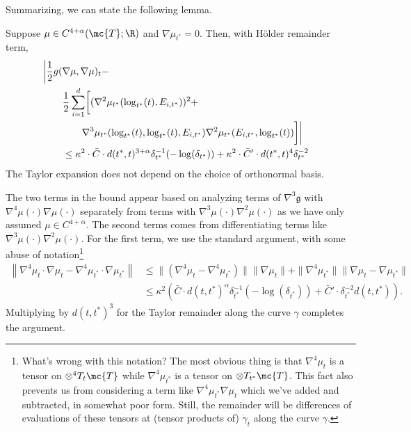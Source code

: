 \documentclass{article}
\begin{document}
Summarizing, we can state the following lemma.
\begin{lemma}
\label{lem:grad:density}
  Suppose $\mu \in C^{4+\alpha}(\mc{T};\R)$ and $\nabla \mu_{t^*}=0$. Then, with H\"older remainder term,
  \begin{equation}
\begin{aligned}
\lefteqn{    \biggl| \frac{1}{2} g(\nabla \mu, \nabla \mu)_t -  } \\
& \qquad  \frac{1}{2}\sum_{i=1}^d \biggl[ (\nabla^2 \mu_{t^*}(\log_{t^*}(t), E_{i,t^*}))^2 + \\
    & \qquad \qquad 
      \nabla^3 \mu_{t^*}(\log_{t^*}(t), \log_{t^*}(t), E_{i,t^*}) \nabla^2 \mu_{t^*}(E_{i,t^*}, \log_{t^*}(t)) \biggr] \biggr| \\
& \qquad \leq \kappa^2 \cdot \bar{C} \cdot d(t^*,t)^{3+\alpha} \delta^{-1}_{t^*}(-\log(\delta_{t^*})) +
\kappa^2 \cdot \bar{C}' \cdot d(t^*,t)^4 \delta_{t^*}^{-2}
\end{aligned}
    \end{equation}
The Taylor expansion does not depend on the choice of orthonormal basis.
  \end{lemma}
The two terms in the bound appear  based on analyzing terms of $\nabla^3 \mathfrak{g}$ with $\nabla^4 \mu(\cdot) \nabla \mu(\cdot)$ separately from
terms with $\nabla^3 \mu(\cdot) \nabla^2 \mu(\cdot)$ as we have only assumed $\mu \in C^{4+\alpha}$. The second
terms comes from differentiating terms like $\nabla^3 \mu(\cdot) \nabla^2 \mu(\cdot)$. For the first term, we use the standard argument, with some abuse of notation\footnote{What's wrong with this notation? The most obvious thing
is that $\nabla^4 \mu_t$ is a tensor on $\otimes^4 T_t\mc{T}$ while $\nabla^4 \mu_{t^*}$ is a tensor
on $\otimes T_{t^*}\mc{T}$. This fact also prevents us from considering a term like $\nabla^4 \mu_{t^*}\nabla \mu_t$ which we've added and subtracted, in somewhat poor form. Still, the remainder will be differences of evaluations of these tensors at (tensor products of) $\dot{\gamma}_t$
along the curve $\gamma$. }
$$
\begin{aligned}
  \left\|\nabla^4 \mu_t \cdot \nabla \mu_t - \nabla^4 \mu_{t^*} \cdot \nabla\mu_{t^*} \right\|
&  \leq \|(\nabla^4\mu_t - \nabla^4 \mu_{t^*})\| \|\nabla \mu_{t}\| +
  \|\nabla^4 \mu_{t^*}\| \|\nabla \mu_t - \nabla \mu_{t^*}\| \\
  & \leq \kappa^2 \left( \bar{C} \cdot d(t,t^*)^{\alpha} \delta_{t^*}^{-1}(-\log(\delta_{t^*})) + \bar{C}' \cdot \delta_{t^*}^{-2} d(t,t^*) \right).
\end{aligned}
$$
Multiplying by $d(t,t^*)^3$ for the Taylor remainder along the curve $\gamma$ completes the argument.
\end{document}
